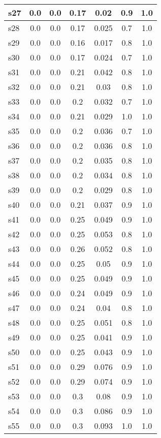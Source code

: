 \documentclass{article}
\begin{document}
\begin{tabular}{|l|c|c|c|c|c|c|}
\hline
s27 &0.0 & 0.0 & 0.17 & 0.02 & 0.9 & 1.0\\
\hline
s28 &0.0 & 0.0 & 0.17 & 0.025 & 0.7 & 1.0\\
\hline
s29 &0.0 & 0.0 & 0.16 & 0.017 & 0.8 & 1.0\\
\hline
s30 &0.0 & 0.0 & 0.17 & 0.024 & 0.7 & 1.0\\
\hline
s31 &0.0 & 0.0 & 0.21 & 0.042 & 0.8 & 1.0\\
\hline
s32 &0.0 & 0.0 & 0.21 & 0.03 & 0.8 & 1.0\\
\hline
s33 &0.0 & 0.0 & 0.2 & 0.032 & 0.7 & 1.0\\
\hline
s34 &0.0 & 0.0 & 0.21 & 0.029 & 1.0 & 1.0\\
\hline
s35 &0.0 & 0.0 & 0.2 & 0.036 & 0.7 & 1.0\\
\hline
s36 &0.0 & 0.0 & 0.2 & 0.036 & 0.8 & 1.0\\
\hline
s37 &0.0 & 0.0 & 0.2 & 0.035 & 0.8 & 1.0\\
\hline
s38 &0.0 & 0.0 & 0.2 & 0.034 & 0.8 & 1.0\\
\hline
s39 &0.0 & 0.0 & 0.2 & 0.029 & 0.8 & 1.0\\
\hline
s40 &0.0 & 0.0 & 0.21 & 0.037 & 0.9 & 1.0\\
\hline
s41 &0.0 & 0.0 & 0.25 & 0.049 & 0.9 & 1.0\\
\hline
s42 &0.0 & 0.0 & 0.25 & 0.053 & 0.8 & 1.0\\
\hline
s43 &0.0 & 0.0 & 0.26 & 0.052 & 0.8 & 1.0\\
\hline
s44 &0.0 & 0.0 & 0.25 & 0.05 & 0.9 & 1.0\\
\hline
s45 &0.0 & 0.0 & 0.25 & 0.049 & 0.9 & 1.0\\
\hline
s46 &0.0 & 0.0 & 0.24 & 0.049 & 0.9 & 1.0\\
\hline
s47 &0.0 & 0.0 & 0.24 & 0.04 & 0.8 & 1.0\\
\hline
s48 &0.0 & 0.0 & 0.25 & 0.051 & 0.8 & 1.0\\
\hline
s49 &0.0 & 0.0 & 0.25 & 0.041 & 0.9 & 1.0\\
\hline
s50 &0.0 & 0.0 & 0.25 & 0.043 & 0.9 & 1.0\\
\hline
s51 &0.0 & 0.0 & 0.29 & 0.076 & 0.9 & 1.0\\
\hline
s52 &0.0 & 0.0 & 0.29 & 0.074 & 0.9 & 1.0\\
\hline
s53 &0.0 & 0.0 & 0.3 & 0.08 & 0.9 & 1.0\\
\hline
s54 &0.0 & 0.0 & 0.3 & 0.086 & 0.9 & 1.0\\
\hline
s55 &0.0 & 0.0 & 0.3 & 0.093 & 1.0 & 1.0\\

\end{tabular}
\end{document}
